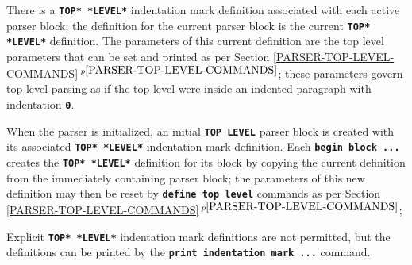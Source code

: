\documentclass[12pt]{article}
\newcommand{\TT}[1]{{\tt \bfseries #1}}
\newcommand{\itemref}[1]{\ref{#1}$\,^{p\pageref{#1}}$}
\begin{document}
There is a \TT{*TOP* *LEVEL*} indentation mark definition associated
with each active parser block; the definition for the current parser
block is the current \TT{*TOP* *LEVEL*} definition.
The parameters of this current definition are the top level parameters that
can be set and printed as per Section \itemref{PARSER-TOP-LEVEL-COMMANDS};
these parameters govern top level parsing as if the top level were inside
an indented paragraph with indentation \TT{0}.

When the parser is initialized, an initial \TT{TOP LEVEL} parser block
is created with its associated \TT{*TOP* *LEVEL*} indentation mark definition.
Each \TT{begin block ...} creates the \TT{*TOP* *LEVEL*} definition for
its block by copying the current definition from the immediately
containing parser block; the parameters of this new definition may
then be reset by \TT{define top level} commands as per
Section \itemref{PARSER-TOP-LEVEL-COMMANDS};

Explicit \TT{*TOP* *LEVEL*} indentation mark definitions are not permitted,
but the definitions can be printed by the \TT{print indentation mark ...}
command.
\end{document}
